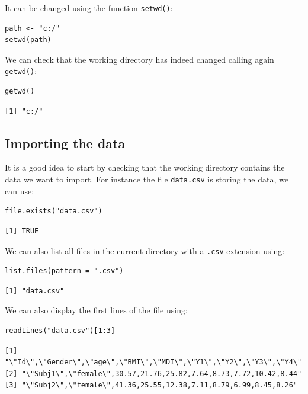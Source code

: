 \documentclass{article}
\begin{document}
It can be changed using the function \texttt{setwd()}:
\lstset{language=r,label= ,caption= ,captionpos=b,numbers=none}
\begin{lstlisting}
path <- "c:/"
setwd(path)
\end{lstlisting}

We can check that the working directory has indeed changed calling
again \texttt{getwd()}:
\lstset{language=r,label= ,caption= ,captionpos=b,numbers=none}
\begin{lstlisting}
getwd()
\end{lstlisting}

\begin{verbatim}
[1] "c:/"
\end{verbatim}

\subsection{Importing the data}
\label{sec:orgfc3be2b}

It is a good idea to start by checking that the working directory
contains the data we want to import. For instance the file \texttt{data.csv}
is storing the data, we can use:
\lstset{language=r,label= ,caption= ,captionpos=b,numbers=none}
\begin{lstlisting}
file.exists("data.csv")
\end{lstlisting}

\begin{verbatim}
[1] TRUE
\end{verbatim}

We can also list all files in the current directory with a \texttt{.csv} extension using:
\lstset{language=r,label= ,caption= ,captionpos=b,numbers=none}
\begin{lstlisting}
list.files(pattern = ".csv")
\end{lstlisting}

\begin{verbatim}
[1] "data.csv"
\end{verbatim}

We can also display the first lines of the file using:
\lstset{language=r,label= ,caption= ,captionpos=b,numbers=none}
\begin{lstlisting}
readLines("data.csv")[1:3]
\end{lstlisting}

\begin{verbatim}
[1] "\"Id\",\"Gender\",\"age\",\"BMI\",\"MDI\",\"Y1\",\"Y2\",\"Y3\",\"Y4\",\"Y5\""
[2] "\"Subj1\",\"female\",30.57,21.76,25.82,7.64,8.73,7.72,10.42,8.44"            
[3] "\"Subj2\",\"female\",41.36,25.55,12.38,7.11,8.79,6.99,8.45,8.26"
\end{verbatim}
\end{document}
